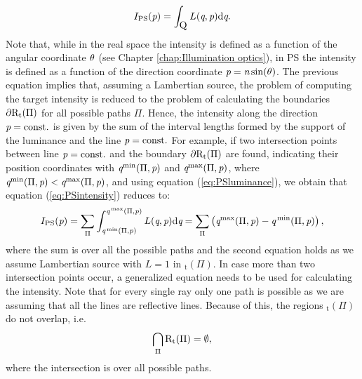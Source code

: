 \begin{equation}
\label{eq:PSintensity}
I_{\textrm{PS}}(\textit{p}) = \int_{\mbox{$\textup{Q}_{\textit{}}$}}L(\textit{q}, \textit{p}) \textrm{d}\textit{q}.
\end{equation}
Note that, while in the real space the intensity is defined as a function of the angular coordinate $\theta$ (see Chapter \ref{chap:Illumination optics}), in PS the intensity is defined as a function of the direction coordinate $\textit{p}=\textit{n}\sin(\theta)$. The previous equation implies that, assuming a Lambertian source, the problem of computing the target intensity is reduced to the problem of calculating the boundaries
$\partial\mbox{$\textup{R}$}_\textrm{t}(\Pi)$ for all possible paths $\Pi$. Hence, the intensity along the direction $\textit{p}= \textrm{const.}$ is given by the sum of the interval lengths formed by the support of the luminance and the line $\textit{p}=\textrm{const.}$ For example, if two intersection points between line $\textit{p}= \textrm{const.}$ and the boundary $\partial\mbox{$\textup{R}$}_\textrm{t}(\Pi)$ are found, indicating their position coordinates with $\textit{q}^\textrm{min}(\Pi,\textit{p})$ and $\textit{q}^\textrm{max}(\Pi,\textit{p})$, where $\textit{q}^\textrm{min}(\Pi,\textit{p})<\textit{q}^\textrm{max}(\Pi,\textit{p})$, and using equation (\ref{eq:PSluminance}), we obtain that equation (\ref{eq:PSintensity}) reduces to:
\begin{equation}\label{eta2}
I_{\textrm{PS}}(\textit{p}) = \sum_{\Pi}\int_{\textit{q}^\textrm{\,min}(\Pi, \textit{p})}^{\textit{q}^\textrm{\,max}(\Pi,\textit{p})}L(\textit{q}, \textit{p})\textrm{d}\textit{q} = \sum_{\Pi}\big (\textit{q}^\textrm{max}(\Pi,\textit{p})-\textit{q}^\textrm{\,min}(\Pi,\textit{p})\big )\,,
\end{equation}
where the sum is over all the possible paths and the second equation holds as we assume Lambertian source with $L=1$ in $_\textrm{t}(\Pi).$ In case more than two intersection points occur, a generalized equation needs to be used for calculating the intensity. 
Note that for every single ray only one path is possible as we are assuming that all the lines are reflective lines.
Because of this, the regions $_\textrm{t}(\Pi)$ do not overlap, i.e.
\begin{equation}
\bigcap_{\Pi}\mbox{$\textup{R}$}_\textrm{t}(\Pi)= \emptyset,
\end{equation}
where the intersection is over all possible paths. \\ \indent
